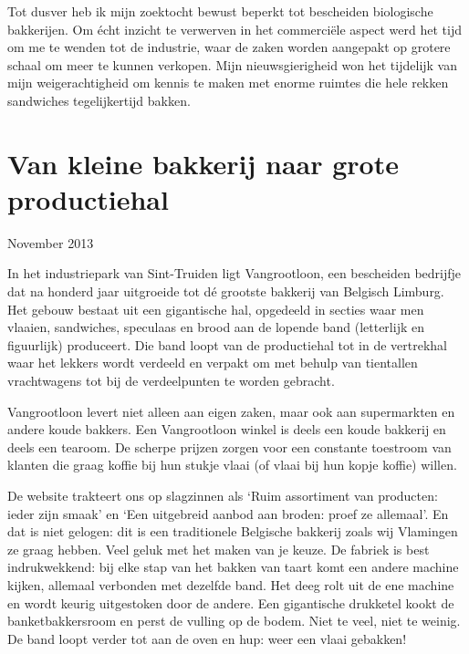 \documentclass[
  11pt,
  dutch,
]{memoir}
\begin{document}
Tot dusver heb ik mijn zoektocht bewust beperkt tot bescheiden
biologische bakkerijen. Om écht inzicht te verwerven in het commerciële
aspect werd het tijd om me te wenden tot de industrie, waar de zaken
worden aangepakt op grotere schaal om meer te kunnen verkopen. Mijn
nieuwsgierigheid won het tijdelijk van mijn weigerachtigheid om kennis
te maken met enorme ruimtes die hele rekken sandwiches tegelijkertijd
bakken.

\hypertarget{van-kleine-bakkerij-naar-grote-productiehal}{%
\section{Van kleine bakkerij naar grote
productiehal}\label{van-kleine-bakkerij-naar-grote-productiehal}}

\begin{flushright}
November 2013
\end{flushright}

In het industriepark van Sint-Truiden ligt Vangrootloon, een bescheiden
bedrijfje dat na honderd jaar uitgroeide tot dé grootste bakkerij van
Belgisch Limburg. Het gebouw bestaat uit een gigantische hal, opgedeeld
in secties waar men vlaaien, sandwiches, speculaas en brood aan de
lopende band (letterlijk en figuurlijk) produceert. Die band loopt van
de productiehal tot in de vertrekhal waar het lekkers wordt verdeeld en
verpakt om met behulp van tientallen vrachtwagens tot bij de
verdeelpunten te worden gebracht.

Vangrootloon levert niet alleen aan eigen zaken, maar ook aan
supermarkten en andere koude bakkers. Een Vangrootloon winkel is deels
een koude bakkerij en deels een tearoom. De scherpe prijzen zorgen voor
een constante toestroom van klanten die graag koffie bij hun stukje
vlaai (of vlaai bij hun kopje koffie) willen.

De website trakteert ons op slagzinnen als `Ruim assortiment van
producten: ieder zijn smaak' en `Een uitgebreid aanbod aan broden: proef
ze allemaal'. En dat is niet gelogen: dit is een traditionele Belgische
bakkerij zoals wij Vlamingen ze graag hebben. Veel geluk met het maken
van je keuze. De fabriek is best indrukwekkend: bij elke stap van het
bakken van taart komt een andere machine kijken, allemaal verbonden met
dezelfde band. Het deeg rolt uit de ene machine en wordt keurig
uitgestoken door de andere. Een gigantische drukketel kookt de
banketbakkersroom en perst de vulling op de bodem. Niet te veel, niet te
weinig. De band loopt verder tot aan de oven en hup: weer een vlaai
gebakken!
\end{document}
